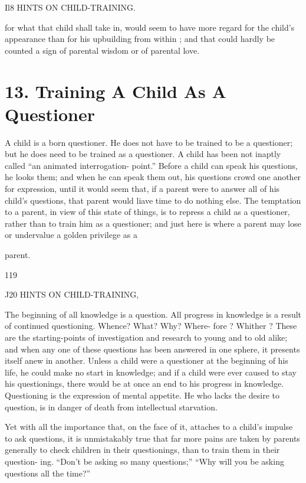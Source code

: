 \documentclass[
]{book}
\begin{document}
Il8 HINTS ON CHILD-TRAINING.

for what that child shall take in, would seem to have more regard for the child's appearance than for his upbuilding from within ; and that could hardly be counted a sign of parental wisdom or of parental love.

\hypertarget{training-a-child-as-a-questioner}{%
\chapter{13. Training A Child As A Questioner}\label{training-a-child-as-a-questioner}}

A child is a born questioner. He does not have to be trained to be a questioner; but he does need to be trained as a questioner. A child has been not inaptly called ``an animated interrogation- point.'' Before a child can speak his questions, he looks them; and when he can speak them out, his questions crowd one another for expression, until it would seem that, if a parent were to answer all of his child's questions, that parent would liave time to do nothing else. The temptation to a parent, in view of this state of things, is to repress a child as a questioner, rather than to train him as a questioner; and just here is where a parent may lose or undervalue a golden privilege as a

parent.

119

J20 HINTS ON CHILD-TRAINING,

The beginning of all knowledge is a question. All progress in knowledge is a result of continued questioning. Whence? What? Why? Where- fore ? Whither ? These are the starting-points of investigation and research to young and to old alike; and when any one of these questions has been answered in one sphere, it presents itself anew in another. Unless a child were a questioner at the beginning of his life, he could make no start in knowledge; and if a child were ever caused to stay his questionings, there would be at once an end to his progress in knowledge. Questioning is the expression of mental appetite. He who lacks the desire to question, is in danger of death from intellectual starvation.

Yet with all the importance that, on the face of it, attaches to a child's impulse to ask questions, it is unmistakably true that far more pains are taken by parents generally to check children in their questionings, than to train them in their question- ing. ``Don't be asking so many questions;'' ``Why will you be asking questions all the time?''
\end{document}
